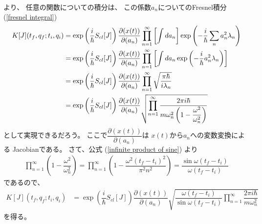 より、
任意の関数についての積分は、
この係数$a_n$についてのFresnel積分
(\ref{fresnel integral})
\begin{align}
    K[J]( t_f, q_f ; t_i, q_i )
    &=
    \exp\left(
        \dfrac{i}{\hbar} S_{cl} [J]
    \right)
        \dfrac{ \partial ( x(t) ) }
            { \partial (a_n) }
    \prod_{n=1}^\infty
    \left[
        \int d a_n
    \right]
    \exp\left(
        -
        \dfrac{ i }{\hbar}
        \sum_{n}
        a_n^2
        \lambda_n
    \right)
\notag\\&=
    \exp\left(
        \dfrac{i}{\hbar} S_{cl} [J]
    \right)
        \dfrac{ \partial ( x(t) ) }
            { \partial (a_n) }
    \prod_{n=1}^\infty
    \left[
        \int d a_n
        \exp\left(
            -
            \dfrac{ i }{\hbar}
            a_n^2
            \lambda_n
        \right)
    \right]
\notag\\&=
    \exp\left(
        \dfrac{i}{\hbar} S_{cl} [J]
    \right)
        \dfrac{ \partial ( x(t) ) }
            { \partial (a_n) }
    \prod_{n=1}^\infty
    \sqrt{
        \dfrac{\pi \hbar}{i \lambda_n}
    }
\notag\\&=
    \exp\left(
        \dfrac{i}{\hbar} S_{cl} [J]
    \right)
        \dfrac{ \partial ( x(t) ) }
            { \partial (a_n) }
    \sqrt{
        \prod_{n=1}^\infty
        \dfrac{2 \pi i \hbar}{
            m \omega_n^2 \left(
                1 - \dfrac{ \omega^2 }{ \omega_n^2 }
            \right)
        }
    }
\end{align}
として実現できるだろう。
ここで$\dfrac{ \partial ( x(t) ) }{ \partial (a_n) }$は
$x(t)$から$a_n$への変数変換による
Jacobianである。
さて、公式
(\ref{infinite product of sine})
より
\begin{align}
    \prod_{n=1}^\infty
    \left(
        1 - \dfrac{ \omega^2 }{ \omega_n^2 }
    \right)
    =
    \prod_{n=1}^\infty
    \left(
        1
        -
        \dfrac{
            \omega^2 (t_f - t_i)^2
        }{ \pi^2 n^2 }
    \right)
    =
    \dfrac{
        \sin \omega (t_f - t_i)
    }{ \omega (t_f - t_i) }
\end{align}
であるので、
\begin{align}
    K[J]( t_f, q_f ; t_i, q_i )
    &=
    \exp\left(
        \dfrac{i}{\hbar} S_{cl} [J]
    \right)
        \dfrac{ \partial ( x(t) ) }
            { \partial (a_n) }
    \sqrt{
        \dfrac{
            \omega (t_f - t_i)
        }{
            \sin \omega (t_f - t_i)
        }
        \prod_{n=1}^\infty
        \dfrac{
            2 \pi i \hbar
        }{
            m \omega_n^2
        }
    }
\end{align}
を得る。

